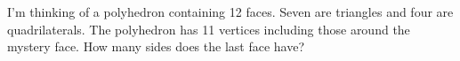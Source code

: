 \documentclass{book}
\begin{document}
\setcounter{project}{33}
\addtocounter{project}{-1}
\begin{activity}[]\label{activity-28}
\hypertarget{p-326}{}%
I'm thinking of a polyhedron containing 12 faces. Seven are triangles and four are quadrilaterals. The polyhedron has 11 vertices including those around the mystery face. How many sides does the last face have?%
\end{activity}
\end{document}
